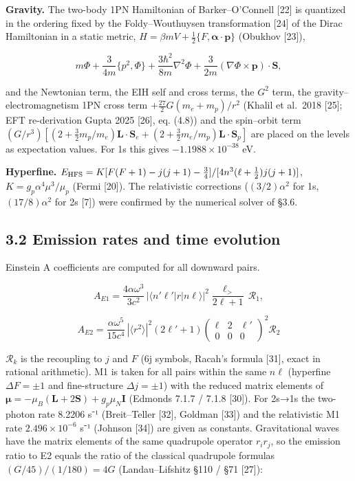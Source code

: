 \documentclass[
  a4paper,
]{article}
\begin{document}
\textbf{Gravity.} The two-body 1PN Hamiltonian of Barker--O'Connell
{[}22{]} is quantized in the ordering fixed by the Foldy--Wouthuysen
transformation {[}24{]} of the Dirac Hamiltonian in a static metric,
\(H=\beta mV+\tfrac12\{F,\boldsymbol\alpha\cdot\mathbf p\}\) (Obukhov
{[}23{]}),

\[
m\Phi+\frac{3}{4m}\{p^2,\Phi\}+\frac{3\hbar^2}{8m}\nabla^2\Phi+\frac{3}{2m}(\nabla\Phi\times\mathbf p)\cdot\mathbf S,
\]

and the Newtonian term, the EIH self and cross terms, the \(G^2\) term,
the gravity--electromagnetism 1PN cross term
\(+\tfrac{27}{2}G(m_e+m_p)/r^2\) (Khalil et al.~2018 {[}25{]}; EFT
re-derivation Gupta 2025 {[}26{]}, eq. (4.8)) and the spin--orbit term
\((G/r^3)[(2+\tfrac32m_p/m_e)\mathbf L\cdot\mathbf S_e+(2+\tfrac32m_e/m_p)\mathbf L\cdot\mathbf S_p]\)
are placed on the levels as expectation values. For 1s this gives
\(-1.1988\times10^{-38}\) eV.

\textbf{Hyperfine.}
\(E_{\rm HFS}=K[F(F+1)-j(j+1)-\tfrac34]/[4n^3(\ell+\tfrac12)j(j+1)]\),
\(K=g_p\alpha^4\mu^3/\mu_p\) (Fermi {[}20{]}). The relativistic
corrections (\((3/2)\alpha^2\) for 1s, \((17/8)\alpha^2\) for 2s
{[}7{]}) were confirmed by the numerical solver of §3.6.

\subsection{3.2 Emission rates and time
evolution}\label{emission-rates-and-time-evolution}

Einstein A coefficients are computed for all downward pairs.

\[
A_{E1}=\frac{4\alpha\omega^3}{3c^2}\,|\langle n'\ell'|r|n\ell\rangle|^2\frac{\ell_>}{2\ell+1}\,\mathcal R_1,
\]

\[
A_{E2}=\frac{\alpha\omega^5}{15c^4}\,|\langle r^2\rangle|^2(2\ell'+1)\begin{pmatrix}\ell&2&\ell'\\0&0&0\end{pmatrix}^2\mathcal R_2
\]

\(\mathcal R_k\) is the recoupling to \(j\) and \(F\) (6j symbols,
Racah's formula {[}31{]}, exact in rational arithmetic). M1 is taken for
all pairs within the same \(n\ell\) (hyperfine \(\Delta F=\pm1\) and
fine-structure \(\Delta j=\pm1\)) with the reduced matrix elements of
\(\boldsymbol\mu=-\mu_B(\mathbf L+2\mathbf S)+g_p\mu_N\mathbf I\)
(Edmonds 7.1.7 / 7.1.8 {[}30{]}). For 2s→1s the two-photon rate 8.2206
s⁻¹ (Breit--Teller {[}32{]}, Goldman {[}33{]}) and the relativistic M1
rate \(2.496\times10^{-6}\) s⁻¹ (Johnson {[}34{]}) are given as
constants. Gravitational waves have the matrix elements of the same
quadrupole operator \(r_ir_j\), so the emission ratio to E2 equals the
ratio of the classical quadrupole formulas \((G/45)/(1/180)=4G\)
(Landau--Lifshitz §110 / §71 {[}27{]}):
\end{document}
